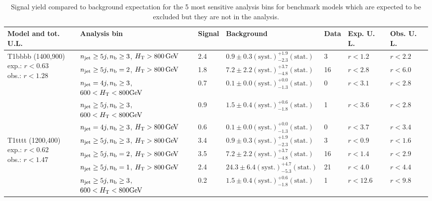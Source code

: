 \newpage
\begin{table}[h!] 
  \scriptsize
  \caption{ 
Signal yield compared to background expectation for the 5 most sensitive analysis bins 
for benchmark models which are expected to be excluded but they are not in the analysis.
  \label{tab:sigBenchmarksYields_excess}}
  \centering 
  \begin{tabular}{ lllllll } 
    \hline 
    \hline 
    Model and tot. U.L. & Analysis bin & Signal & Background & Data & Exp. U. L. & Obs. U. L. \\ \hline
\multirow{5}{*}{\parbox[t]{2cm}{T1bbbb (1400,900)\\exp.: $r<0.63$\\obs.: $r<1.28$}}
 & $n_{\mathrm{jet}} \geq5j,n_{\text{b}} \geq3$, $\mbox{$H_\text{T}$} > 800 \, \mathrm{GeV}$ & 2.4 & $0.9 \pm 0.3 \mathrm{(syst.)} ^{+1.9}_{-2.3} \mathrm{(stat.)}$ & 3 & $r < 1.2$ & $r < 2.2$\\ 
 & $n_{\mathrm{jet}} \geq5j,n_{\text{b}} =2$, $\mbox{$H_\text{T}$} > 800 \, \mathrm{GeV}$ & 1.8 & $7.2 \pm 2.2 \mathrm{(syst.)} ^{+3.7}_{-4.8} \mathrm{(stat.)}$ & 16 & $r < 2.8$ & $r < 6.0$\\ 
 & $n_{\mathrm{jet}} =4j,n_{\text{b}} \geq3$, $600 < \mbox{$H_\text{T}$} < 800 \mathrm{GeV}$ & 0.7 & $0.1 \pm 0.0 \mathrm{(syst.)} ^{+0.0}_{-1.3} \mathrm{(stat.)}$ & 0 & $r < 3.1$ & $r < 2.8$\\ 
 & $n_{\mathrm{jet}} \geq5j,n_{\text{b}} \geq3$, $600 < \mbox{$H_\text{T}$} < 800 \mathrm{GeV}$ & 0.9 & $1.5 \pm 0.4 \mathrm{(syst.)} ^{+0.6}_{-1.8} \mathrm{(stat.)}$ & 1 & $r < 3.6$ & $r < 2.8$\\ 
 & $n_{\mathrm{jet}} =4j,n_{\text{b}} \geq3$, $\mbox{$H_\text{T}$} > 800 \, \mathrm{GeV}$ & 0.6 & $0.1 \pm 0.0 \mathrm{(syst.)} ^{+0.0}_{-1.3} \mathrm{(stat.)}$ & 0 & $r < 3.7$ & $r < 3.4$\\ \hline
\multirow{5}{*}{\parbox[t]{2cm}{T1tttt (1200,400)\\exp.: $r<0.62$\\obs.: $r<1.47$}}
 & $n_{\mathrm{jet}} \geq5j,n_{\text{b}} \geq3$, $\mbox{$H_\text{T}$} > 800 \, \mathrm{GeV}$ & 3.4 & $0.9 \pm 0.3 \mathrm{(syst.)} ^{+1.9}_{-2.3} \mathrm{(stat.)}$ & 3 & $r < 0.9$ & $r < 1.6$\\ 
 & $n_{\mathrm{jet}} \geq5j,n_{\text{b}} =2$, $\mbox{$H_\text{T}$} > 800 \, \mathrm{GeV}$ & 3.5 & $7.2 \pm 2.2 \mathrm{(syst.)} ^{+3.7}_{-4.8} \mathrm{(stat.)}$ & 16 & $r < 1.4$ & $r < 2.9$\\ 
 & $n_{\mathrm{jet}} \geq5j,n_{\text{b}} =1$, $\mbox{$H_\text{T}$} > 800 \, \mathrm{GeV}$ & 2.4 & $24.3 \pm 6.4 \mathrm{(syst.)} ^{+4.7}_{-5.3} \mathrm{(stat.)}$ & 21 & $r < 4.0$ & $r < 4.4$\\ 
 & $n_{\mathrm{jet}} \geq5j,n_{\text{b}} \geq3$, $600 < \mbox{$H_\text{T}$} < 800 \mathrm{GeV}$ & 0.2 & $1.5 \pm 0.4 \mathrm{(syst.)} ^{+0.6}_{-1.8} \mathrm{(stat.)}$ & 1 & $r < 12.6$ & $r < 9.8$\\ 

\end{tabular}
\end{table}
